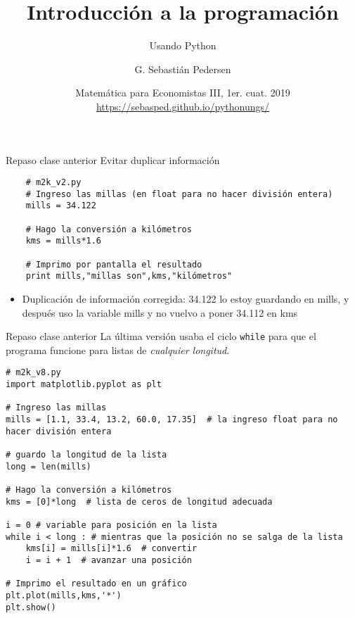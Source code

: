 \documentclass[9pt]{beamer}
\title[Intro Prog] %
{Introducción a la programación}
\subtitle
{Usando Python}
\author[SP]
{G. Sebastián Pedersen}%
\institute[UNGS] %
{
  Instituto de Industria\\
  Universidad Nacional de General Sarmiento
}
\date[] %
{Matemática para Economistas III, 1er. cuat. 2019\\ 
\vspace{.5cm}
\url{https://sebasped.github.io/pythonungs/}
}
\begin{document}
\begin{frame}
  \titlepage
\end{frame}



\begin{frame}[fragile]{Repaso clase anterior}
Evitar \alert{duplicar información}
\footnotesize{\begin{verbatim}
	# m2k_v2.py
	# Ingreso las millas (en float para no hacer división entera)
	mills = 34.122
	
	# Hago la conversión a kilómetros
	kms = mills*1.6
	
	# Imprimo por pantalla el resultado
	print mills,"millas son",kms,"kilómetros"
	\end{verbatim}}%
\begin{itemize}
	\item \alert{Duplicación de información corregida:} 34.122 lo estoy guardando en mills, y después uso la variable mills y no vuelvo a poner 34.112 en kms
\end{itemize}
\end{frame}


\begin{frame}[fragile]{Repaso clase anterior}
La última versión usaba el ciclo \verb|while| para que el programa funcione para listas de \emph{cualquier longitud}.
\footnotesize{\begin{verbatim}
# m2k_v8.py
import matplotlib.pyplot as plt

# Ingreso las millas
mills = [1.1, 33.4, 13.2, 60.0, 17.35]  # la ingreso float para no hacer división entera

# guardo la longitud de la lista
long = len(mills)

# Hago la conversión a kilómetros
kms = [0]*long  # lista de ceros de longitud adecuada

i = 0 # variable para posición en la lista
while i < long : # mientras que la posición no se salga de la lista
    kms[i] = mills[i]*1.6  # convertir
    i = i + 1  # avanzar una posición

# Imprimo el resultado en un gráfico
plt.plot(mills,kms,'*')
plt.show()
\end{verbatim}}

\end{frame}
\end{document}
